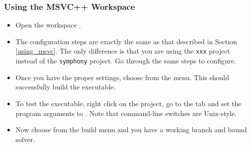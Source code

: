 \subsubsection{Using the MSVC++ Workspace}

\begin{itemize}

\item Open the workspace .

\item The configuration steps are exactly the same as that described in
  Section \ref{using_msvc}. The only difference is that you are using the
  \texttt{xxx} project instead of the \texttt{symphony} project. Go through
  the same steps to configure.

\item Once you have the proper settings, choose  from the  menu. This should successfully 
build the executable.

\item
To test the executable, right click on the  project, go to the
 tab and set the program arguments to 
. Note that command-line switches are 
Unix-style.

\item
Now choose  from the build menu and you have a working branch
and bound solver. 

\end{itemize}

